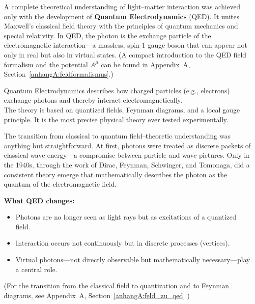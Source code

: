 A complete theoretical understanding of light–matter interaction was achieved only with the development of \textbf{Quantum Electrodynamics} (QED).
It unites Maxwell’s classical field theory with the principles of quantum mechanics and special relativity.
In QED, the photon is the exchange particle of the electromagnetic interaction—a massless, spin-1 gauge boson that can appear not only in real but also in virtual states.
(A compact introduction to the QED field formalism and the potential \(A^\mu\) can be found in Appendix~A, Section~\ref{anhangA:feldformalismus}.)
\newpage
\noindent
\vspace{1em}
\begin{tcolorbox}[physikbox, title=What is Quantum Electrodynamics?]
	\label{box:was ist quantenelektro}
	\small
	Quantum Electrodynamics describes how charged particles (e.g., electrons) exchange photons and thereby interact electromagnetically.\\
	The theory is based on quantized fields, Feynman diagrams, and a local gauge principle. It is the most precise physical theory ever tested experimentally.
\end{tcolorbox}
\vspace{1em}

The transition from classical to quantum field–theoretic understanding was anything but straightforward. At first, photons were treated as discrete packets of classical wave energy—a compromise between particle and wave pictures.
Only in the 1940s, through the work of Dirac, Feynman, Schwinger, and Tomonaga, did a consistent theory emerge that mathematically describes the photon as the quantum of the electromagnetic field.

\textbf{What QED changes:}
\begin{itemize}
	\item Photons are no longer seen as light rays but as excitations of a quantized field.
	\item Interaction occurs not continuously but in discrete processes (vertices).
	\item Virtual photons—not directly observable but mathematically necessary—play a central role.
\end{itemize}
(For the transition from the classical field to quantization and to Feynman diagrams, see Appendix~A, Section~\ref{anhangA:feld_zu_qed}.)

